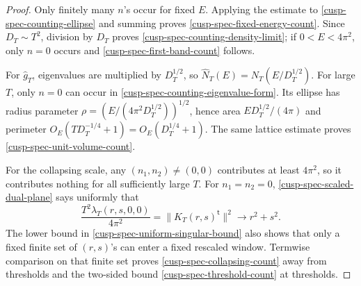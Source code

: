 \begin{proof}
Only finitely many \(n\)'s occur for fixed \(E\).  Applying the estimate to
\cref{cusp-spec-counting-ellipse} and summing proves
\cref{cusp-spec-fixed-energy-count}.  Since \(D_T\sim T^2\), division by
\(D_T\) proves \cref{cusp-spec-counting-density-limit}; if
\(0<E<4\pi^2\), only \(n=0\) occurs and
\cref{cusp-spec-first-band-count} follows.

For \(\widehat g_T\), eigenvalues are multiplied by \(D_T^{1/2}\), so
\(\widehat N_T(E)=N_T(E/D_T^{1/2})\).  For large \(T\), only \(n=0\)
can occur in \cref{cusp-spec-counting-eigenvalue-form}.  Its ellipse has
radius parameter
\(\rho=(E/(4\pi^2D_T^{1/2}))^{1/2}\), hence area
\(ED_T^{1/2}/(4\pi)\) and perimeter
\(O_E(TD_T^{-1/4}+1)=O_E(D_T^{1/4}+1)\).  The same lattice estimate proves
\cref{cusp-spec-unit-volume-count}.

For the collapsing scale, any \((n_1,n_2)\ne(0,0)\) contributes at least
\(4\pi^2\), so it contributes nothing for all sufficiently large \(T\).
For \(n_1=n_2=0\),
\cref{cusp-spec-scaled-dual-plane} says uniformly that
\[
 \frac{T^2\lambda_T(r,s,0,0)}{4\pi^2}
 =\lVert K_T(r,s)^{\mathsf t}\rVert^2
 \longrightarrow r^2+s^2.
\]
The lower bound in \cref{cusp-spec-uniform-singular-bound} also shows that
only a fixed finite set of \((r,s)\)'s can enter a fixed rescaled window.
Termwise comparison on that finite set proves
\cref{cusp-spec-collapsing-count} away from thresholds and the two-sided
bound \cref{cusp-spec-threshold-count} at thresholds.
\end{proof}

